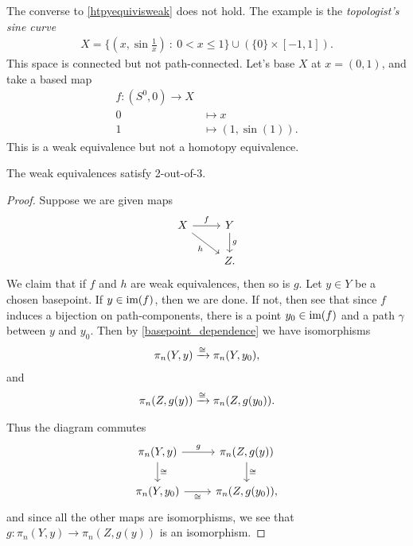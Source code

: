 \documentclass{article}[11pt]
\begin{document}
\begin{remark} The converse to \autoref{htpyequivisweak} does not hold. The example is the \textit{topologist's sine curve}
\begin{align*}
	X = \{ (x,\sin\frac{1}{x}) \ : \ 0<x \leq 1\} \cup (\{0\}\times[-1,1]).
\end{align*}
This space is connected but not path-connected. Let's base $X$ at $x = (0,1)$, and take a based map
\begin{align*}
	f \colon (S^0,0) \to X \\
	0 &\mapsto x \\
	1&\mapsto (1,\sin(1)).
\end{align*}
This is a weak equivalence but not a homotopy equivalence.
\end{remark}

\begin{proposition} The weak equivalences satisfy 2-out-of-3.
\end{proposition}
\begin{proof} Suppose we are given maps
\[
	\begin{tikzcd}
	X\rar["f" above]\ar[dr,"h" below left] & Y\dar["g" right] \\
	 & Z.
	\end{tikzcd}
\]
We claim that if $f$ and $h$ are weak equivalences, then so is $g$. Let $y \in Y$ be a chosen basepoint. If $y\in \text{im}(f)$, then we are done. If not, then see that since $f$ induces a bijection on path-components, there is a point $y_0 \in \text{im}(f)$ and a path $\gamma$ between $y$ and $y_0$. Then by \autoref{basepoint_dependence} we have  isomorphisms
\begin{align*}
	\pi_n(Y,y) \xrightarrow{\cong} \pi_n(Y,y_0),
\end{align*}
and 
\begin{align*}
	\pi_n(Z,g(y)) \xrightarrow{\cong} \pi_n(Z,g(y_0)).
\end{align*}

Thus the diagram commutes
\[
	\begin{tikzcd}
	\pi_n(Y,y)\dar["\cong"]\rar["g" above] & \pi_n(Z,g(y))\dar["\cong"] \\
	\pi_n(Y,y_0)\rar["\cong" below] & \pi_n(Z,g(y_0)),
	\end{tikzcd}
\]
and since all the other maps are isomorphisms, we see that $g\colon \pi_n(Y,y) \to \pi_n(Z,g(y))$ is an isomorphism.

\end{proof}
\end{document}
